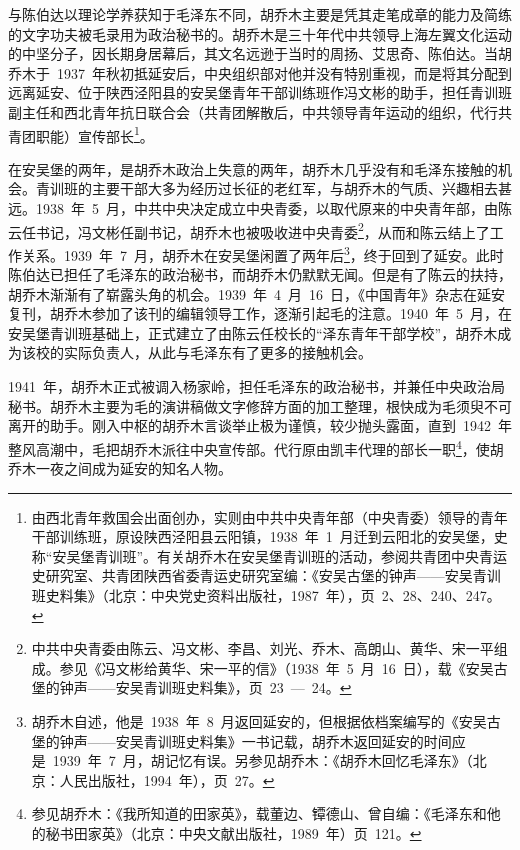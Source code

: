 与陈伯达以理论学养获知于毛泽东不同，胡乔木主要是凭其走笔成章的能力及简练的文字功夫被毛录用为政治秘书的。胡乔木是三十年代中共领导上海左翼文化运动的中坚分子，因长期身居幕后，其文名远逊于当时的周扬、艾思奇、陈伯达。当胡乔木于~1937~年秋初抵延安后，中央组织部对他并没有特别重视，而是将其分配到远离延安、位于陕西泾阳县的安吴堡青年干部训练班作冯文彬的助手，担任青训班副主任和西北青年抗日联合会（共青团解散后，中共领导青年运动的组织，代行共青团职能）宣传部长\footnote{由西北青年救国会出面创办，实则由中共中央青年部（中央青委）领导的青年干部训练班，原设陕西泾阳县云阳镇，1938~年~1~月迁到云阳北的安吴堡，史称“安吴堡青训班”。有关胡乔木在安吴堡青训班的活动，参阅共青团中央青运史研究室、共青团陕西省委青运史研究室编：《安吴古堡的钟声——安吴青训班史料集》（北京：中央党史资料出版社，1987~年），页~2、28、240、247。}。

在安吴堡的两年，是胡乔木政治上失意的两年，胡乔木几乎没有和毛泽东接触的机会。青训班的主要干部大多为经历过长征的老红军，与胡乔木的气质、兴趣相去甚远。1938~年~5~月，中共中央决定成立中央青委，以取代原来的中央青年部，由陈云任书记，冯文彬任副书记，胡乔木也被吸收进中央青委\footnote{中共中央青委由陈云、冯文彬、李昌、刘光、乔木、高朗山、黄华、宋一平组成。参见《冯文彬给黄华、宋一平的信》（1938~年~5~月~16~日），载《安吴古堡的钟声——安吴青训班史料集》，页~23~—~24。}，从而和陈云结上了工作关系。1939~年~7~月，胡乔木在安吴堡闲置了两年后\footnote{胡乔木自述，他是~1938~年~8~月返回延安的，但根据依档案编写的《安吴古堡的钟声——安吴青训班史料集》一书记载，胡乔木返回延安的时间应是~1939~年~7~月，胡记忆有误。另参见胡乔木：《胡乔木回忆毛泽东》（北京：人民出版社，1994~年），页~27。}，终于回到了延安。此时陈伯达已担任了毛泽东的政治秘书，而胡乔木仍默默无闻。但是有了陈云的扶持，胡乔木渐渐有了崭露头角的机会。1939~年~4~月~16~日，《中国青年》杂志在延安复刊，胡乔木参加了该刊的编辑领导工作，逐渐引起毛的注意。1940~年~5~月，在安吴堡青训班基础上，正式建立了由陈云任校长的“泽东青年干部学校”，胡乔木成为该校的实际负责人，从此与毛泽东有了更多的接触机会。

1941~年，胡乔木正式被调入杨家岭，担任毛泽东的政治秘书，并兼任中央政治局秘书。胡乔木主要为毛的演讲稿做文字修辞方面的加工整理，根快成为毛须臾不可离开的助手。刚入中枢的胡乔木言谈举止极为谨慎，较少抛头露面，直到~1942~年整风高潮中，毛把胡乔木派往中央宣传部。代行原由凯丰代理的部长一职\footnote{参见胡乔木：《我所知道的田家英》，载董边、镡德山、曾自编：《毛泽东和他的秘书田家英》（北京：中央文献出版社，1989~年）页~121。}，使胡乔木一夜之间成为延安的知名人物。

